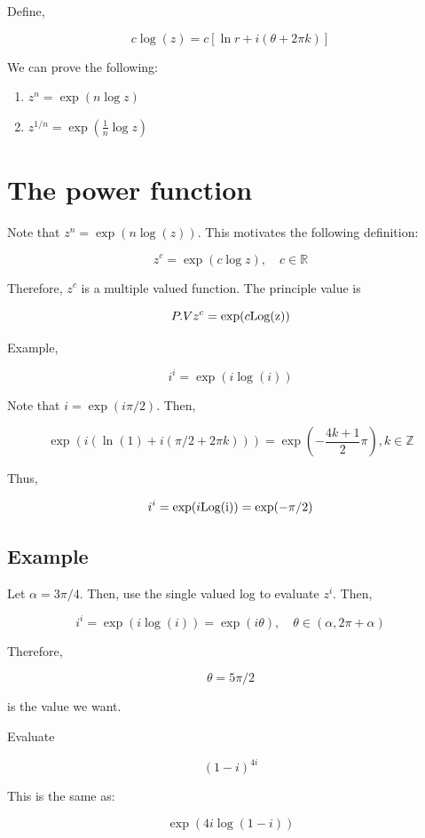 \documentclass{article}
\newtheorem{one minute paper}[theorem]{One Minute Paper}
\begin{document}
Define, 

\begin{equation}
    c\log(z) = c\left[ \ln r + i(\theta + 2\pi k) \right]
\end{equation}

We can prove the following:
\begin{enumerate}
    \item $z^n = \exp(n \log z)$
    \item $z^{1/n} = \exp(\frac{1}{n}\log z)$
\end{enumerate}

\section*{The power function}

Note that $z^n = \exp(n\log(z))$. This motivates the following definition: 

\begin{equation}
    z^c = \exp(c\log z), \quad c \in \mathbb{R}
\end{equation}

Therefore, $z^c$ is a multiple valued function. The principle value is 

\begin{equation}
    P.V z^c = \exp(c\rm Log(z))
\end{equation}

Example, 

\begin{equation}
    i^i = \exp(i\log(i))
\end{equation}

Note that $i = \exp(i\pi/2)$. Then, 

\begin{equation}
    \exp(i(\ln(1) + i(\pi/2 + 2\pi k))) = \exp(-\frac{4k + 1}{2}\pi), k \in \mathbb{Z}
\end{equation}

Thus, 

\begin{equation}
    i^i = \exp(i\rm Log(i)) = \exp(-\pi/2)
\end{equation}

\subsection*{Example}

Let $\alpha = 3\pi/4$. Then, use the single valued log to evaluate $z^i$. Then, 

\begin{equation}
    i^i = \exp(i\log(i)) = \exp(i\theta), \quad \theta \in (\alpha, 2\pi + \alpha)
\end{equation}

Therefore, 

\begin{equation}
    \theta = 5\pi/2
\end{equation}

is the value we want. 

Evaluate 

\begin{equation}
    (1-i)^{4i}
\end{equation}

This is the same as:

\begin{equation}
    \exp(4i\log(1-i))
\end{equation}
\end{document}

